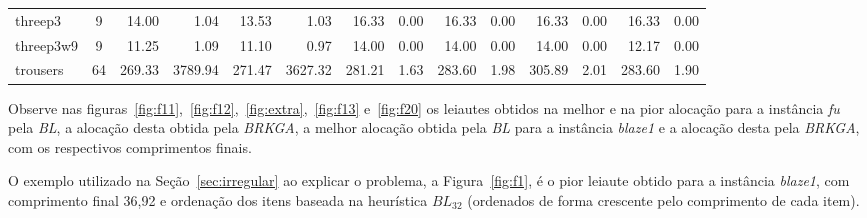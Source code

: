 \documentclass[12pt, openright, twoside, a4paper, english, brazilian]{USPSC-classe/USPSC}
\newcommand{\lgray}{\cellcolor{lightgray}}
\begin{document}
\begin{adjustwidth}{-2.5 cm}{-2.5 cm}
\begin{threeparttable}[!htb]
{\begin{tabular}{|l|c|rr|rr|rr|rr|rr|rr|}
        threep3 &9 &14.00 &1.04 &\lgray13.53 &1.03 &16.33 &0.00 &16.33 &0.00 &16.33 &0.00 &16.33 &0.00 \\
        threep3w9 &9 &11.25 &1.09 &\lgray11.10 &0.97 &14.00 &0.00 &14.00 &0.00 &14.00 &0.00 &12.17 &0.00 \\
        trousers &64 &\lgray269.33 &3789.94 &271.47 &3627.32 &281.21 &1.63 &283.60 &1.98 &305.89 &2.01 &283.60 &1.90 \\
        \hline
    \end{tabular}
    }
    \label{tab:t4}
\end{threeparttable}\end{adjustwidth}

\vspace{15pt}


Observe nas figuras~\ref{fig:f11},~\ref{fig:f12},~\ref{fig:extra},~\ref{fig:f13} e~\ref{fig:f20} os leiautes obtidos na melhor e na pior alocação para a instância {\it fu} pela {\it BL}, a alocação desta obtida pela {\it BRKGA}, a melhor alocação obtida pela {\it BL} para a instância {\it blaze1} e a alocação desta pela {\it BRKGA}, com os respectivos comprimentos finais.

O exemplo utilizado na Seção~\ref{sec:irregular} ao explicar o problema, a Figura~\ref{fig:f1}, é o pior leiaute obtido para a instância {\it blaze1}, com comprimento final 36,92 e ordenação dos itens baseada na heurística $BL_{32}$ (ordenados de forma crescente pelo comprimento de cada item).
\end{document}
